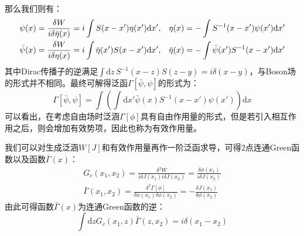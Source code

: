那么我们则有：
\begin{align}
\psi(x)&=\frac{\delta W}{i\delta\bar{\eta}(x)}=i\int S(x-x')\eta(x')\mathrm{d}x',&\eta(x)&=-\int S^{-1}(x-x')\psi(x')\mathrm{d}x'\notag\\
\bar{\psi}(x)&=\frac{\delta W}{i\delta{\eta}(x)}=i\int \bar{\eta}(x')S(x-x')\mathrm{d}x',&\bar{\eta}(x)&=-\int \bar{\psi}(x')S^{-1}(x-x')\mathrm{d}x'
\end{align}
其中Dirac传播子的逆满足$\int\mathrm{d}z\,S^{-1}(x-z)S(z-y)=i\delta(x-y)$，与Boson场的形式并不相同。最终可解得泛函$\Gamma[\bar{\psi},{\psi}]$的形式为：
\begin{equation}
\Gamma[\bar{\psi},{\psi}]=\int\left(\int\mathrm{d}x'\bar{\psi}(x)S^{-1}(x-x')\psi(x')\right)\mathrm{d}x
\end{equation}
可以看出，在考虑自由场时泛涵$\Gamma[\phi]$具有自由作用量的形式，但是若引入相互作用之后，则会增加有效势项，因此也称为有效作用量。

我们可以对生成泛涵$W[J]$和有效作用量再作一阶泛函求导，可得2点连通Green函数以及函数$\bar{\Gamma}(x)$：
\begin{gather}
G_c(x_1,x_2)=\frac{\delta^2W}{i\delta J(x_1)i\delta J(x_2)}=\frac{\delta\phi(x_1)}{i\delta J(x_2)}\\
\bar{\Gamma}(x_1,x_2)=\frac{\delta^2\Gamma[\phi]}{\delta\phi(x_1)\delta\phi(x_2)}=-\frac{\delta J(x_1)}{\delta\phi(x_2)}
\end{gather}
由此可得函数$\bar{\Gamma}(x)$为连通Green函数的逆：
\begin{equation}
\int\mathrm{d}z G_c(x_1,z)\bar{\Gamma}(z,x_2)=i\delta(x_1-x_2)
\end{equation}

